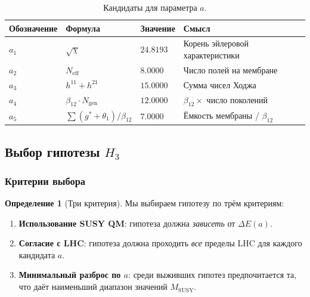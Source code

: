 \documentclass[11pt,a4paper]{article}
\theoremstyle{definition}
\newtheorem{definition}[theorem]{Определение}
\begin{document}
\begin{table}[ht]
\centering
\caption{Кандидаты для параметра \texorpdfstring{$a$}{a}.}
\label{tab:a-candidates-main}
\begin{tabular}{llll}
\toprule
Обозначение & Формула & Значение & Смысл \\
\midrule
$a_1$ & $\sqrt{\chi}$ & $24.8193$ & Корень эйлеровой характеристики \\
$a_2$ & $N_{\text{eff}}$ & $8.0000$ & Число полей на мембране \\
$a_3$ & $h^{11} + h^{21}$ & $15.0000$ & Сумма чисел Ходжа \\
$a_4$ & $\beta_{12} \cdot N_{\text{gen}}$ & $12.0000$ & $\beta_{12} \times$ число поколений \\
$a_5$ & $\sum(g^* + \theta_1)/\beta_{12}$ & $7.0000$ & Ёмкость мембраны / $\beta_{12}$ \\
\bottomrule
\end{tabular}
\end{table}

\subsection{Выбор гипотезы \texorpdfstring{$H_3$}{H\_3}}
\label{subsec:susy-selection}

\subsubsection{Критерии выбора}

\begin{definition}[Три критерия]
\label{def:three-criteria}
Мы выбираем гипотезу по трём критериям:
\begin{enumerate}
    \item \textbf{Использование SUSY QM}: гипотеза должна
          \emph{зависеть} от $\Delta E(a)$.
    \item \textbf{Согласие с LHC}: гипотеза должна проходить
          \emph{все} пределы LHC для каждого кандидата $a$.
    \item \textbf{Минимальный разброс по $a$}: среди выживших
          гипотез предпочитается та, что даёт наименьший
          диапазон значений $M_{\text{SUSY}}$.
\end{enumerate}
\end{definition}
\end{document}
